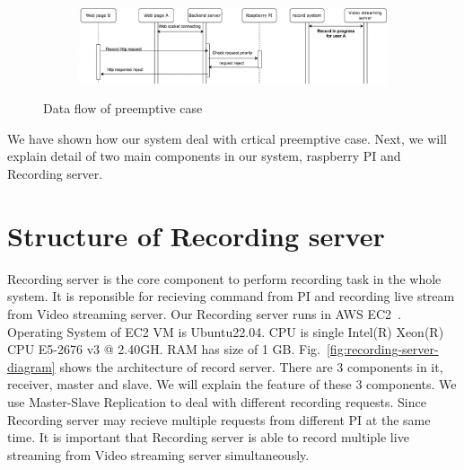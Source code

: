 \begin{figure}[H]
    \ContinuedFloat
    \centering
    \begin{subfigure}{\textwidth}
        \includegraphics[width=\textwidth]{figsrc/preemptive-B-lower.png}
        \label{fig:preemptive-B-lower}
    \end{subfigure}

    \caption{Data flow of preemptive case}
    \label{fig:preemptive-sequence}
\end{figure}

We have shown how our system deal with crtical preemptive case. Next, we will explain detail of two main components in our system, raspberry PI and Recording server. 

\section{Structure of Recording server}
Recording server is the core component to perform recording task in the whole system. It is reponsible for recieving command from PI and recording live stream from Video streaming server. Our Recording server runs in AWS EC2~\cite{aws-ec2}. Operating System of EC2 VM is Ubuntu22.04. CPU is single Intel(R) Xeon(R) CPU E5-2676 v3 @ 2.40GH. RAM has size of 1 GB. Fig.~\ref{fig:recording-server-diagram} shows the architecture of record server. There are 3 components in it, receiver, master and slave. We will explain the feature of these 3 components. We use Master-Slave Replication to deal with different recording requests. Since Recording server may recieve multiple requests from different PI at the same time. It is important that Recording server is able to record multiple live streaming from Video streaming server simultaneously. 

